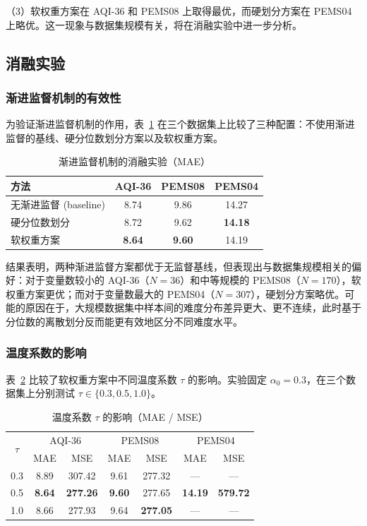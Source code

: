 （3）软权重方案在 AQI-36 和 PEMS08 上取得最优，而硬划分方案在 PEMS04 上略优。这一现象与数据集规模有关，将在消融实验中进一步分析。

\subsection{消融实验}

\subsubsection{渐进监督机制的有效性}

为验证渐进监督机制的作用，表~\ref{tab:ablation_method} 在三个数据集上比较了三种配置：不使用渐进监督的基线、硬分位数划分方案以及软权重方案。

\begin{table}[htbp]
\centering
\caption{\label{tab:ablation_method}渐进监督机制的消融实验（MAE）}
\begin{tabular}{l|ccc}
\toprule
方法 & AQI-36 & PEMS08 & PEMS04 \\
\midrule
无渐进监督 (baseline) & 8.74 & 9.86 & 14.27 \\
硬分位数划分 & 8.72 & 9.62 & \textbf{14.18} \\
软权重方案 & \textbf{8.64} & \textbf{9.60} & 14.19 \\
\bottomrule
\end{tabular}
\end{table}

结果表明，两种渐进监督方案都优于无监督基线，但表现出与数据集规模相关的偏好：对于变量数较小的 AQI-36（$N=36$）和中等规模的 PEMS08（$N=170$），软权重方案更优；而对于变量数最大的 PEMS04（$N=307$），硬划分方案略优。可能的原因在于，大规模数据集中样本间的难度分布差异更大、更不连续，此时基于分位数的离散划分反而能更有效地区分不同难度水平。

\subsubsection{温度系数的影响}

表~\ref{tab:ablation_temperature} 比较了软权重方案中不同温度系数 $\tau$ 的影响。实验固定 $\alpha_0=0.3$，在三个数据集上分别测试 $\tau\in\{0.3, 0.5, 1.0\}$。

\begin{table}[htbp]
\centering
\caption{\label{tab:ablation_temperature}温度系数 $\tau$ 的影响（MAE / MSE）}
\begin{tabular}{c|cc|cc|cc}
\toprule
\multirow{2}{*}{$\tau$} & \multicolumn{2}{c|}{AQI-36} & \multicolumn{2}{c|}{PEMS08} & \multicolumn{2}{c}{PEMS04} \\
 & MAE & MSE & MAE & MSE & MAE & MSE \\
\midrule
0.3 & 8.89 & 307.42 & 9.61 & 277.32 & — & — \\
0.5 & \textbf{8.64} & \textbf{277.26} & \textbf{9.60} & 277.65 & \textbf{14.19} & \textbf{579.72} \\
1.0 & 8.66 & 277.93 & 9.64 & \textbf{277.05} & — & — \\
\bottomrule
\end{tabular}
\end{table}

